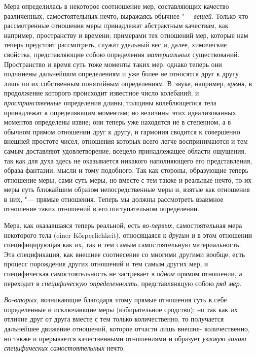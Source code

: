 
Мера определилась в некоторое соотношение мер,
составляющих качество различенных, самостоятельных нечто, выражаясь обычнее
"--- {\em вещей}. Только что рассмотренные отношения меры
принадлежат абстрактным качествам, как например, пространству и времени;
примерами тех отношений мер, которые нам теперь предстоит рассмотреть,
служат удельный вес и, далее, химические свойства, представляющие собою
определения {\em материальных} существований.
Пространство и время суть тоже моменты таких мер, однако теперь они
подчинены дальнейшим определениям и уже более не относятся друг к другу
лишь по их собственным понятийным определениям. В~звуке, например,
{\em время}, в продолжение которого происходит
известное число колебаний, и {\em пространственные}
определения длины, толщины колеблющегося тела принадлежат к определяющим
моментам; но величины этих идеализованных моментов определены извне; они
теперь уже находятся не в степенн\'{о}м, а в обычном прямом отношении друг к
другу, и гармония сводится к совершенно внешней простоте чисел, отношения
которых всего легче воспринимаются и тем самым доставляют удовлетворение,
всецело принадлежащее области ощущения, так как для духа здесь не
оказывается никакого наполняющего его представления, образа фантазии, мысли
и тому подобного. Так как стороны, образующие теперь отношение меры, сами
суть меры, но вместе с тем также и реальные нечто, то их меры суть
ближайшим образом непосредственные меры и, взятые как отношения в них, "---
прямые отношения. Теперь мы должны рассмотреть взаимное отношение таких
отношений в его поступательном определении.

Мера, как оказавшаяся теперь реальной, есть
{\em во-первых}, самостоятельная мера некоторого тела
(einer Körperlichkeit), относящаяся к {\em другим} и в
этом отношении специфицирующая как их, так и тем самым самостоятельную
материальность. Эта спецификация, как внешнее соотнесение со многими
другими вообще, есть процесс порождения других отношений и тем самым других
мер, и специфическая самостоятельность не застревает в
{\em одном} прямом отношении, а переходит в
{\em специфическую определенность}, представляющую собою {\em ряд мер}.

{\em Во-вторых}, возникающие благодаря этому прямые
отношения суть в себе определенные и исключающие меры (избирательное
сродство); но так как их отличие друг от друга вместе с тем только
количественно, то получается дальнейшее движение отношений, которое отчасти
лишь внешне- количественно, но также и прерывается качественными
отношениями и образует {\em узловую линию специфических самостоятельных} нечто.

